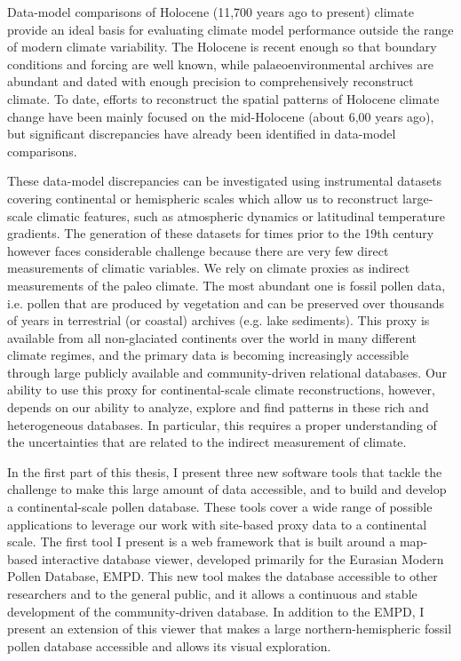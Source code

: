 \begin{thesisabstract}[]
\addchaptertocentry{\abstractname} %
Data-model comparisons of Holocene (11,700 years ago to present) climate provide an ideal basis for evaluating climate model performance outside the range of modern climate variability. The Holocene  is recent enough so that boundary conditions and forcing are well known, while palaeoenvironmental archives are abundant and dated with enough precision to comprehensively reconstruct climate. To date, efforts to reconstruct the spatial patterns of Holocene climate change have been mainly focused on the mid-Holocene (about 6,00 years ago), but significant discrepancies have already been identified in data-model comparisons.

These data-model discrepancies can be investigated using instrumental datasets covering continental or hemispheric scales which allow us to reconstruct large-scale climatic features, such as atmospheric dynamics or latitudinal temperature gradients. The generation of these datasets for times prior to the 19th century however faces considerable challenge because there are very few direct measurements of climatic variables. We rely on climate proxies as indirect measurements of the paleo climate. The most abundant one is fossil pollen data, i.e. pollen that are produced by vegetation and can be preserved over thousands of years in terrestrial (or coastal) archives (e.g. lake sediments). This proxy is available from all non-glaciated continents over the world in many different climate regimes, and the primary data is becoming increasingly accessible through large publicly available and community-driven relational databases. Our ability to use this proxy for continental-scale climate reconstructions, however, depends on our ability to analyze, explore and find patterns in these rich and heterogeneous databases. In particular, this requires a proper understanding of the uncertainties that are related to the indirect measurement of climate.

In the first part of this thesis, I present three new software tools that tackle the challenge to make this large amount of data accessible, and to build and develop a continental-scale pollen database. These tools cover a wide range of possible applications to leverage our work with site-based proxy data to a continental scale.
The first tool I present is a web framework that is built around a map-based interactive database viewer, developed primarily for the Eurasian Modern Pollen Database, EMPD. This new tool makes the database accessible to other researchers and to the general public, and it allows a continuous and stable development of the community-driven database. In addition to the EMPD, I present an extension of this viewer that makes a large northern-hemispheric fossil pollen database accessible and allows its visual exploration.


\end{thesisabstract}
